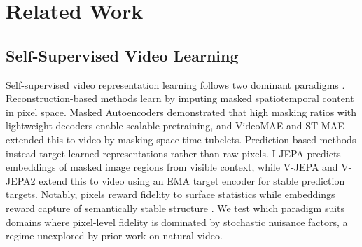 \documentclass{article}
\theoremstyle{plain}
\theoremstyle{definition}
\theoremstyle{remark}
\begin{document}
    
    







\section{Related Work}
\label{sec:related}

\subsection{Self-Supervised Video Learning}
\label{sec:related:ssl}
Self-supervised video representation learning follows two dominant paradigms \citep{han2021selfsupervisedcotrainingvideorepresentation}. Reconstruction-based methods learn by imputing masked spatiotemporal content in pixel space. Masked Autoencoders \cite{mae} demonstrated that high masking ratios with lightweight decoders enable scalable pretraining, and VideoMAE \cite{videomae} and ST-MAE \cite{stmae} extended this to video by masking space-time tubelets. Prediction-based methods instead target learned representations rather than raw pixels. I-JEPA \cite{ijepa} predicts embeddings of masked image regions from visible context, while V-JEPA \cite{vjepa} and V-JEPA2 \cite{vjepa2} extend this to video using an EMA target encoder for stable prediction targets. Notably, pixels reward fidelity to surface statistics while embeddings reward capture of semantically stable structure \citep{mishra2026selfsupervisedlearningechocardiographicvideo}. We test which paradigm suits domains where pixel-level fidelity is dominated by stochastic nuisance factors, a regime unexplored by prior work on natural video.
\end{document}
